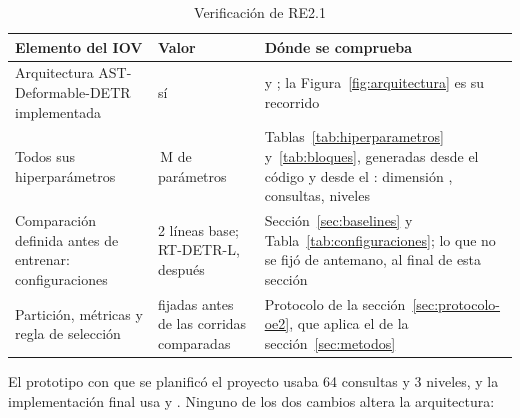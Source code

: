 \begin{table}[htbp]
    \centering
    \small
    \begin{threeparttable}
        \caption{Verificación de RE2.1}
        \label{tab:verificacion-re21}
        \begin{tabular}{@{}L{3.6cm}L{2.2cm}L{7.6cm}@{}}
            \toprule
            \textbf{Elemento del IOV} & \textbf{Valor} & \textbf{Dónde se comprueba} \\
            \midrule
            Arquitectura AST-Deformable-DETR implementada & sí &  y ; la Figura~\ref{fig:arquitectura} es su recorrido \\
            Todos sus hiperparámetros & \mParams{}\,M de parámetros & Tablas~\ref{tab:hiperparametros} y~\ref{tab:bloques}, generadas desde el código y desde el : dimensión \mDim{}, \mQueries{} consultas, \mLevels{} niveles \\
            Comparación definida antes de entrenar: configuraciones & 2 líneas base; RT-DETR-L, después & Sección~\ref{sec:baselines} y Tabla~\ref{tab:configuraciones}; lo que no se fijó de antemano, al final de esta sección \\
            Partición, métricas y regla de selección & fijadas antes de las corridas comparadas & Protocolo de la sección~\ref{sec:protocolo-oe2}, que aplica el de la sección~\ref{sec:metodos} \\
            \bottomrule
        \end{tabular}
    \end{threeparttable}
\end{table}

 El prototipo con
que se planificó el proyecto usaba 64 consultas y 3 niveles, y la implementación
final usa \mQueries{} y \mLevels{}. Ninguno de los dos cambios altera la
arquitectura:

